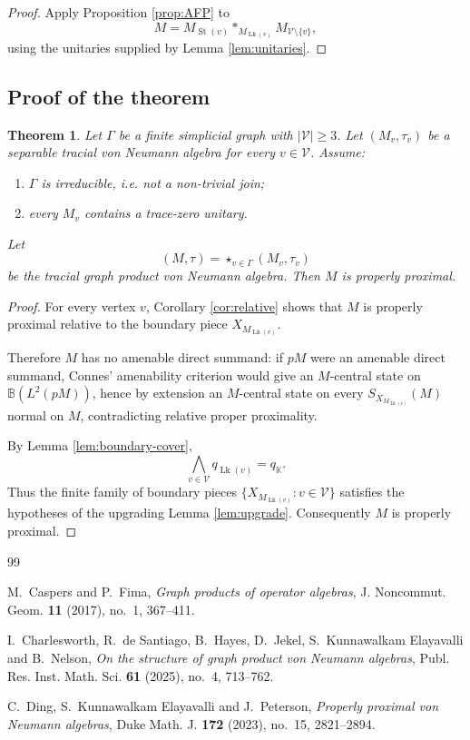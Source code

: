 \documentclass[12pt]{article}
\newtheorem{theorem}{Theorem}[section]
\theoremstyle{definition}
\newcommand{\V}{\mathcal V}
\newcommand{\Lk}{\operatorname{Lk}}
\newcommand{\St}{\operatorname{St}}
\newcommand{\B}{\mathbb B}
\newcommand{\K}{\mathbb K}
\newcommand{\freeprod}{\mathop{*}}
\begin{document}
\begin{proof}
Apply Proposition \ref{prop:AFP} to
\[
M
=
M_{\St(v)}
\freeprod_{M_{\Lk(v)}}
M_{\V\setminus\{v\}},
\]
using the unitaries supplied by Lemma \ref{lem:unitaries}.
\end{proof}

\subsection{Proof of the theorem}

\begin{theorem}
Let $\Gamma$ be a finite simplicial graph with $|\V|\geq 3$.  Let $(M_v,\tau_v)$ be a separable tracial von Neumann algebra for every $v\in \V$.  Assume:
\begin{enumerate}[label=(\alph*)]
\item $\Gamma$ is irreducible, i.e. not a non-trivial join;
\item every $M_v$ contains a trace-zero unitary.
\end{enumerate}
Let
\[
(M,\tau)=\mathop{\star}_{v\in\Gamma}(M_v,\tau_v)
\]
be the tracial graph product von Neumann algebra.  Then $M$ is properly proximal.
\end{theorem}

\begin{proof}
For every vertex $v$, Corollary \ref{cor:relative} shows that $M$ is properly proximal relative to the boundary piece $X_{M_{\Lk(v)}}$.

Therefore $M$ has no amenable direct summand: if $pM$ were an amenable direct summand, Connes' amenability criterion would give an $M$-central state on $\B(L^2(pM))$, hence by extension an $M$-central state on every $S_{X_{M_{\Lk(v)}}}(M)$ normal on $M$, contradicting relative proper proximality.

By Lemma \ref{lem:boundary-cover},
\[
\bigwedge_{v\in\V} q_{\Lk(v)}=q_{\K}.
\]
Thus the finite family of boundary pieces $\{X_{M_{\Lk(v)}}:v\in\V\}$ satisfies the hypotheses of the upgrading Lemma \ref{lem:upgrade}.  Consequently $M$ is properly proximal.
\end{proof}

\begin{thebibliography}{99}

M.~Caspers and P.~Fima,
\emph{Graph products of operator algebras},
J. Noncommut. Geom. \textbf{11} (2017), no.~1, 367--411.

I.~Charlesworth, R.~de Santiago, B.~Hayes, D.~Jekel,
S.~Kunnawalkam Elayavalli and B.~Nelson,
\emph{On the structure of graph product von Neumann algebras},
Publ. Res. Inst. Math. Sci. \textbf{61} (2025), no.~4, 713--762.

C.~Ding, S.~Kunnawalkam Elayavalli and J.~Peterson,
\emph{Properly proximal von Neumann algebras},
Duke Math. J. \textbf{172} (2023), no.~15, 2821--2894.

\end{thebibliography}
\end{document}
